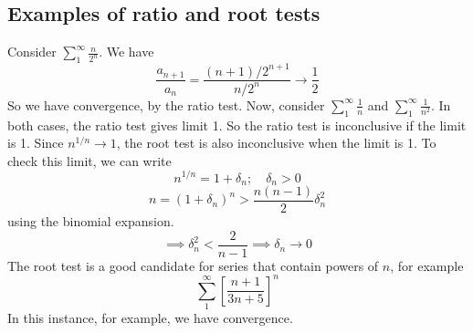 \subsection{Examples of ratio and root tests}
Consider \(\sum_1^\infty \frac{n}{2^n}\).
We have
\[
	\frac{a_{n+1}}{a_n} = \frac{(n+1)/2^{n+1}}{n/2^n} \to \frac{1}{2}
\]
So we have convergence, by the ratio test.
Now, consider \(\sum_1^\infty \frac{1}{n}\) and \(\sum_1^\infty \frac{1}{n^2}\).
In both cases, the ratio test gives limit 1.
So the ratio test is inconclusive if the limit is 1.
Since \(n^{1/n} \to 1\), the root test is also inconclusive when the limit is 1.
To check this limit, we can write
\[
	n^{1/n} = 1 + \delta_n;\quad \delta_n > 0
\]
\[
	n = (1 + \delta_n)^n > \frac{n(n-1)}{2}\delta_n^2
\]
using the binomial expansion.
\[
	\implies \delta_n^2 < \frac{2}{n-1} \implies \delta_n \to 0
\]
The root test is a good candidate for series that contain powers of \(n\), for example
\[
	\sum_1^\infty \left[ \frac{n+1}{3n+5} \right]^n
\]
In this instance, for example, we have convergence.

